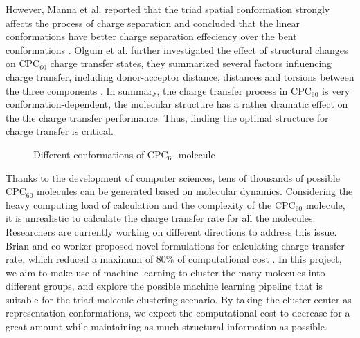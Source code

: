 \documentclass[a4paper]{article}
\begin{document}
However, Manna et al. reported that the triad spatial conformation strongly affects the process of charge separation and concluded that the linear conformations have better charge separation effeciency over the bent conformations \cite{MannaArun}. Olguin et al. further investigated the effect of structural changes on \(\text{CPC}_{60}\) charge transfer states, they summarized several factors influencing charge transfer, including donor-acceptor distance, distances and torsions between the three components \cite{OlguinMarco}. In summary, the charge transfer process in \(\text{CPC}_{60}\) is very conformation-dependent,  the molecular structure has a rather dramatic effect on the the charge transfer performance. Thus, finding the optimal structure for charge transfer is critical.

\begin{figure}[H]
    \centering
    \caption{Different conformations of \(\text{CPC}_{60}\) molecule}
    \label{fig: CPC60}
\end{figure}

Thanks to the development of computer sciences, tens of thousands of possible \(\text{CPC}_{60}\) molecules can be generated based on molecular dynamics. Considering the heavy computing load of calculation and the complexity of the \(\text{CPC}_{60}\) molecule, it is unrealistic to calculate the charge transfer rate for all the molecules. Researchers are currently working on different directions to address this issue. Brian and co-worker proposed novel formulations for calculating charge transfer rate, which reduced a maximum of 80\% of computational cost \cite{BrianDomi}. In this project, we aim to make use of machine learning to cluster the many molecules into different groups, and explore the possible machine learning pipeline that is suitable for the triad-molecule clustering scenario. By taking the cluster center as representation conformations, we expect the computational cost to decrease for a great amount while maintaining as much structural information as possible.
\end{document}
